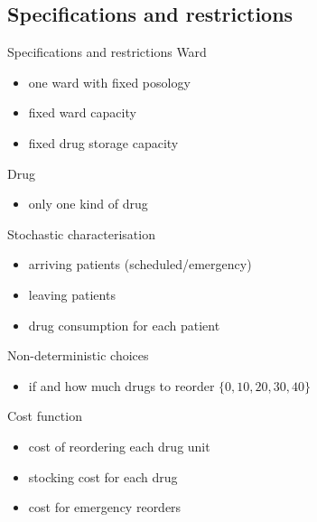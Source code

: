   \subsection{Specifications and restrictions}
    \begin{frame}{Specifications and restrictions}
      Ward
      \begin{itemize}
        \item one ward with fixed posology
        \item fixed ward capacity
        \item fixed drug storage capacity
      \end{itemize}
      Drug
      \begin{itemize}
        \item only one kind of drug
      \end{itemize}
      Stochastic characterisation
      \begin{itemize}
        \item arriving patients (scheduled/emergency)
        \item leaving patients
        \item drug consumption for each patient
      \end{itemize}
      Non-deterministic choices
      \begin{itemize}
        \item if and how much drugs to reorder $\{0, 10, 20, 30, 40\}$
      \end{itemize}
      Cost function
      \begin{itemize}
        \item cost of reordering each drug unit
        \item stocking cost for each drug
        \item cost for emergency reorders
      \end{itemize}
    \end{frame}
